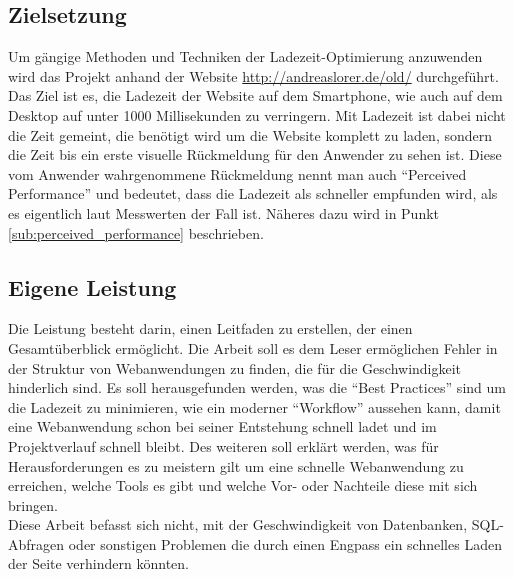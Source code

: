 


	\subsection{Zielsetzung} %
	\label{sub:zielsetzung}
		Um gängige Methoden und Techniken der Ladezeit-Optimierung anzuwenden wird das Projekt anhand der Website \url{http://andreaslorer.de/old/} durchgeführt. Das Ziel ist es, die Ladezeit der Website auf dem Smartphone, wie auch auf dem Desktop auf unter 1000 Millisekunden zu verringern. Mit Ladezeit ist dabei nicht die Zeit gemeint, die benötigt wird um die Website komplett zu laden, sondern die Zeit bis ein erste visuelle Rückmeldung für den Anwender zu sehen ist. Diese vom Anwender wahrgenommene Rückmeldung nennt man auch "`Perceived Performance"' und bedeutet, dass die Ladezeit als schneller empfunden wird, als es eigentlich laut Messwerten der Fall ist. Näheres dazu wird in Punkt \ref{sub:perceived_performance} beschrieben.\\




	\subsection{Eigene Leistung} %
	\label{sub:eigene_leistung}
		Die Leistung besteht darin, einen Leitfaden zu erstellen, der einen Gesamtüberblick ermöglicht. Die Arbeit soll es dem Leser ermöglichen Fehler in der Struktur von Webanwendungen zu finden, die für die Geschwindigkeit hinderlich sind.
		Es soll herausgefunden werden, was die "`Best Practices"' sind um die Ladezeit zu minimieren, wie ein moderner "`Workflow"' aussehen kann, damit eine Webanwendung schon bei seiner Entstehung schnell ladet und im Projektverlauf schnell bleibt. Des weiteren soll erklärt werden, was für Herausforderungen es zu meistern gilt um eine schnelle Webanwendung zu erreichen, welche Tools es gibt und welche Vor- oder Nachteile diese mit sich bringen.\\
		Diese Arbeit befasst sich nicht, mit der Geschwindigkeit von Datenbanken, SQL-Abfragen oder sonstigen Problemen die durch einen Engpass ein schnelles Laden der Seite verhindern könnten.




